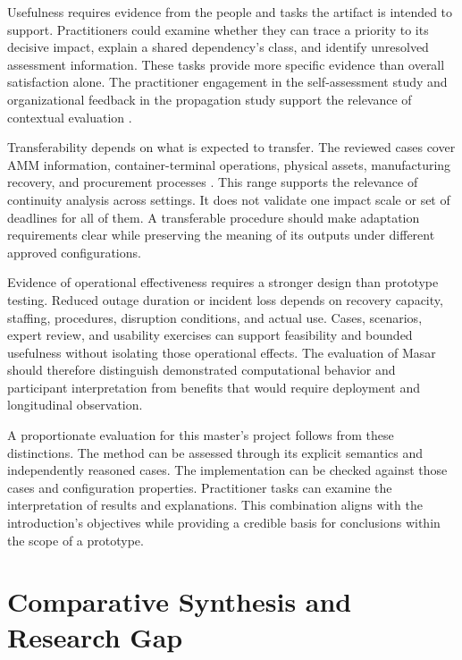 Usefulness requires evidence from the people and tasks the artifact is intended to support. Practitioners could examine whether they can trace a priority to its decisive impact, explain a shared dependency's class, and identify unresolved assessment information. These tasks provide more specific evidence than overall satisfaction alone. The practitioner engagement in the self-assessment study and organizational feedback in the propagation study support the relevance of contextual evaluation \cite{selfassessment2025,raptaki2025propagation}.

Transferability depends on what is expected to transfer. The reviewed cases cover AMM information, container-terminal operations, physical assets, manufacturing recovery, and procurement processes \cite{amm2023bia,container2021bia,assetcriticality2023,sahebjamnia2015integrated,raptaki2025propagation}. This range supports the relevance of continuity analysis across settings. It does not validate one impact scale or set of deadlines for all of them. A transferable procedure should make adaptation requirements clear while preserving the meaning of its outputs under different approved configurations.

Evidence of operational effectiveness requires a stronger design than prototype testing. Reduced outage duration or incident loss depends on recovery capacity, staffing, procedures, disruption conditions, and actual use. Cases, scenarios, expert review, and usability exercises can support feasibility and bounded usefulness without isolating those operational effects. The evaluation of Masar should therefore distinguish demonstrated computational behavior and participant interpretation from benefits that would require deployment and longitudinal observation.

A proportionate evaluation for this master's project follows from these distinctions. The method can be assessed through its explicit semantics and independently reasoned cases. The implementation can be checked against those cases and configuration properties. Practitioner tasks can examine the interpretation of results and explanations. This combination aligns with the introduction's objectives while providing a credible basis for conclusions within the scope of a prototype.

\section{Comparative Synthesis and Research Gap}
\label{sec:lr_gap}

